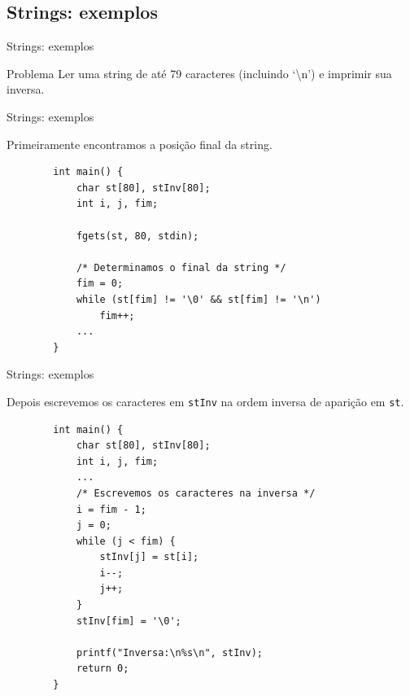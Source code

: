 \documentclass[handout]{beamer}
\newcommand{\cod}[1]{\texttt{#1}}
\begin{document}

\subsection{Strings: exemplos}

\begin{frame}[fragile]{Strings: exemplos}

    \begin{block}{Problema}
        Ler uma string de até 79 caracteres (incluindo `\textbackslash{n}') e imprimir sua inversa.
    \end{block}

\end{frame}

\begin{frame}[fragile]{Strings: exemplos}

    Primeiramente encontramos a posição final da string.

    \begin{verbatim}
        int main() {
            char st[80], stInv[80];
            int i, j, fim;

            fgets(st, 80, stdin);

            /* Determinamos o final da string */
            fim = 0;
            while (st[fim] != '\0' && st[fim] != '\n')
                fim++;
            ...
        }
    \end{verbatim}

\end{frame}

\begin{frame}[fragile]{Strings: exemplos}

    Depois escrevemos os caracteres em \cod{stInv} na ordem inversa de aparição em \cod{st}.

    \begin{verbatim}
        int main() {
            char st[80], stInv[80];
            int i, j, fim;
            ...
            /* Escrevemos os caracteres na inversa */
            i = fim - 1;
            j = 0;
            while (j < fim) {
                stInv[j] = st[i];
                i--;
                j++;
            }
            stInv[fim] = '\0';

            printf("Inversa:\n%s\n", stInv);
            return 0;
        }
    \end{verbatim}

\end{frame}
\end{document}
